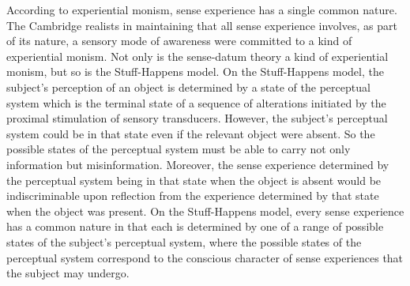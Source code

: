 \documentclass[12pt]{article}
\begin{document}
According to experiential monism, sense experience has a single common nature. The Cambridge realists in maintaining that all sense experience involves, as part of its nature, a sensory mode of awareness were committed to a kind of experiential monism. Not only is the sense-datum theory a kind of experiential monism, but so is the Stuff-Happens model. On the Stuff-Happens model, the subject's perception of an object is determined by a state of the perceptual system which is the terminal state of a sequence of alterations initiated by the proximal stimulation of sensory transducers. However, the subject's perceptual system could be in that state even if the relevant object were absent. So the possible states of the perceptual system must be able to carry not only information but misinformation. Moreover, the sense experience determined by the perceptual system being in that state when the object is absent would be indiscriminable upon reflection from the experience determined by that state when the object was present. On the Stuff-Happens model, every sense experience has a common nature in that each is determined by one of a range of possible states of the subject's perceptual system, where the possible states of the perceptual system correspond to the conscious character of sense experiences that the subject may undergo.
\end{document}
